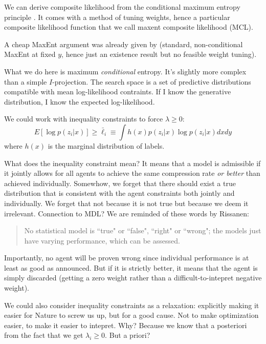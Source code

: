 \documentclass[english]{scrartcl}
\begin{document}
We can derive composite likelihood from the conditional maximum entropy principle \cite{BergerA-96}. It comes with a method of tuning weights, hence a particular composite likelihood function that we call maxent composite likelihood (MCL).

A cheap MaxEnt argument was already given by \cite{Wang-14}  (standard, non-conditional MaxEnt at fixed $y$, hence just an existence result but no feasible weight tuning).

What we do here is maximum {\em conditional} entropy. It's slightly more complex than a simple $I$-projection. The search space is a set of predictive distributions compatible with mean log-likelihood contraints. If I know the generative distribution, I know the expected log-likelihood.

We could work with inequality constraints to force $\lambda\geq 0$:
$$
E[\log p(z_i|x)] \geq \bar{\ell}_i \equiv \int h(x)p(z_i|x) \log p(z_i|x) dx dy
$$
where $h(x)$ is the marginal distribution of labels.

What does the inequality constraint mean? It means that a model is admissible if it jointly allows for all agents to achieve the same compression rate {\em or better} than achieved individually. Somewhow, we forget that there should exist a true distribution that is consistent with the agent constraints both jointly and individually. We forget that not because it is not true but because we deem it irrelevant. Connection to MDL? We are reminded of these words by Rissanen:
\begin{quote}
No statistical model is ``true" or ``false", ``right" or ``wrong"; the models just have varying performance, which can be assessed.  
\end{quote}

Importantly, no agent will be proven wrong since individual performance is at least as good as announced. But if it is strictly better, it means that the agent is simply discarded (getting a zero weight rather than a difficult-to-intepret negative weight).  

We could also consider inequality constraints as a relaxation: explicitly making it easier for Nature to screw us up, but for a good cause. Not to make optimization easier, to make it easier to intepret. Why? Because we know that a posteriori from the fact that we get $\lambda_i\geq 0$. But a priori?

\end{document}
